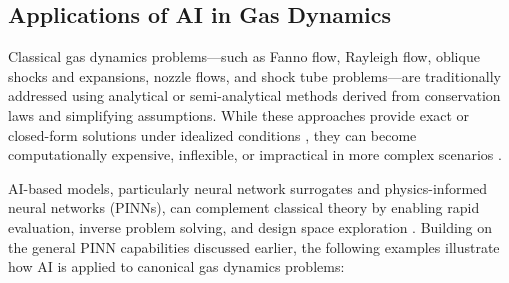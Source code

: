 \documentclass[11pt,a4paper]{report}
\begin{document}
\subsection{Applications of AI in Gas Dynamics}

Classical gas dynamics problems---such as Fanno flow, Rayleigh flow, oblique shocks and expansions, nozzle flows, and shock tube problems---are traditionally addressed using analytical or semi-analytical methods derived from conservation laws and simplifying assumptions. While these approaches provide exact or closed-form solutions under idealized conditions \cite{Anderson1990,Pontes2019,Anderson2021}, they can become computationally expensive, inflexible, or impractical in more complex scenarios \cite{White2011,Duraisamy2019}.

AI-based models, particularly neural network surrogates and physics-informed neural networks (PINNs), can complement classical theory by enabling rapid evaluation, inverse problem solving, and design space exploration \cite{Raissi2019PINN,Roohi2025,Michaloglou2025,Ren2025}. Building on the general PINN capabilities discussed earlier, the following examples illustrate how AI is applied to canonical gas dynamics problems:
\end{document}
